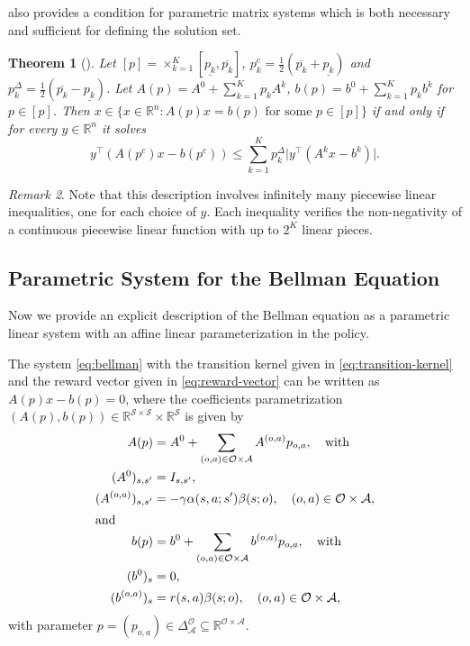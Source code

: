 \documentclass{article}
\newtheorem{theorem}{Theorem}[section]
\theoremstyle{definition}
\theoremstyle{remark}
\newtheorem{remark}[theorem]{Remark}
\begin{document}
\citet{Hladik-2012} also provides a condition for parametric matrix systems which is both necessary and sufficient for defining the solution set. 

\begin{theorem}[{\citealp[Theorem~3]{Hladik-2012}}]
\label{thm:hladik-necessary-sufficient}
Let $[p] = \times_{k=1}^K[\underline{p_k},\overline{p_k}]$, $p_k^c = \frac{1}{2}(\overline{p_k}+\underline{p_k})$ and $p_k^\Delta = \frac{1}{2}(\overline{p_k}-\underline{p_k})$. 
%
Let $A(p) = A^0 + \sum_{k=1}^K p_k A^k$, $b(p)= b^0 + \sum_{k=1}^K p_kb^k$ for $p\in [p]$. 
%
Then $x\in \{x\in\mathbb{R}^n\colon A(p)x=b(p) \text{ for some } p\in [p]\}$ if and only if for every $y \in \mathbb{R}^n$ it solves 
\begin{equation*}
    y^\top (A(p^c)x -b(p^c)) \leq \sum_{k=1}^K p_k^\Delta \vert y^\top (A^k x - b^k)\vert .
\end{equation*}
\end{theorem}
\begin{remark} 
Note that this description involves infinitely many piecewise linear inequalities, one for each choice of $y$. 
Each inequality verifies the non-negativity of a continuous piecewise linear function with up to $2^K$ linear pieces. 
\end{remark} 

\subsection{Parametric System for the Bellman Equation} 
\label{sec:ineq}

Now we provide an explicit description of the Bellman equation as a parametric linear system with an affine linear parameterization in the policy. 

The system \eqref{eq:bellman} with the transition kernel given in \eqref{eq:transition-kernel} and the reward vector given in \eqref{eq:reward-vector} can be written as $A(p) x - b(p) = 0$,  where the coefficients parametrization  $(A(p), b(p)) \in \mathbb{R}^{\mathcal{S}\times\mathcal{S}} \times \mathbb{R}^\mathcal{S}$ is given by 
\begin{align}
    A(p) &= A^{0} + \sum_{(o,a)\in\mathcal{O}\times\mathcal{A}} A^{(o,a)} p_{o,a}, \quad \text{with} \label{eq:eqs1a} \\ 
    (A^0)_{s,s'} &= I_{s,s'}, \nonumber \\
    (A^{(o,a)})_{s,s'} &= -\gamma\alpha(s,a;s')\beta(s;o), \quad (o,a)\in\mathcal{O}\times\mathcal{A} , \nonumber \\
    \intertext{and} b(p) &= b^{0} + \sum_{(o,a)\in\mathcal{O}\times\mathcal{A}} b^{(o,a)} p_{o,a}, \quad \text{with}     \label{eq:eqs1b} \\ 
    (b^{0})_s &= 0, \nonumber\\
    (b^{(o,a)})_s &= r(s,a) \beta(s;o), \quad (o,a)\in\mathcal{O}\times\mathcal{A}, \nonumber 
\end{align}
with parameter $p = (p_{o,a}) \in\Delta^\mathcal{O}_\mathcal{A}\subseteq \mathbb{R}^{\mathcal{O}\times\mathcal{A}}$. 
\end{document}
